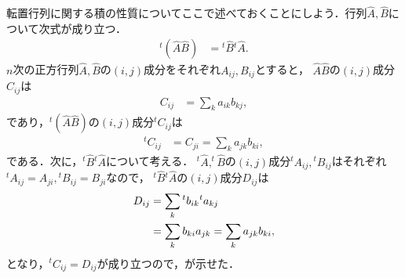\begin{itemize}
転置行列に関する積の性質についてここで述べておくことにしよう．行列$\hat{A},\hat{B}$について次式が成り立つ．
\begin{align}
{}^{t}\left(\hat{A}\hat{B}\right) & ={}^{t}\hat{B}{}^{t}\hat{A}. \label{LA:t(AB)=tBtA}
\end{align}
%
$n$次の正方行列$\hat{A},\hat{B}$の$(i,j)$成分をそれぞれ$A_{ij},B_{ij}$とすると，
$\hat{A}\hat{B}$の$(i,j)$成分$C_{ij}$は
\begin{align}
C_{ij} & =\sum_{k}a_{ik}b_{kj},
\end{align}
であり，${}^{t}\left(\hat{A}\hat{B}\right)$の$(i,j)$成分${}^{t}C_{ij}$は
\begin{align}
^{t}C_{ij} & =C_{ji}=\sum_{k}a_{jk}b_{ki},
\end{align}
である．次に，$^{t}\hat{B}{}^{t}\hat{A}$について考える．
$^{t}\hat{A},^{t}\hat{B}$の$(i,j)$成分$^{t}A_{ij},{}^{t}B_{ij}$はそれぞれ$^{t}A_{ij}=A_{ji},{}^{t}B_{ij}=B_{ji}$なので，
$^{t}\hat{B}{}^{t}\hat{A}$の$(i,j)$成分$D_{ij}$は
\begin{align}
D_{ij} & =\sum_{k}{}^{t}b_{ik}{}^{t}a_{kj}\notag\\
 & =\sum_{k}b_{ki}a_{jk}=\sum_{k}a_{jk}b_{ki},
\end{align}
となり，${}^{t}C_{ij}=D_{ij}$が成り立つので，が示せた．
%
\end{itemize}

